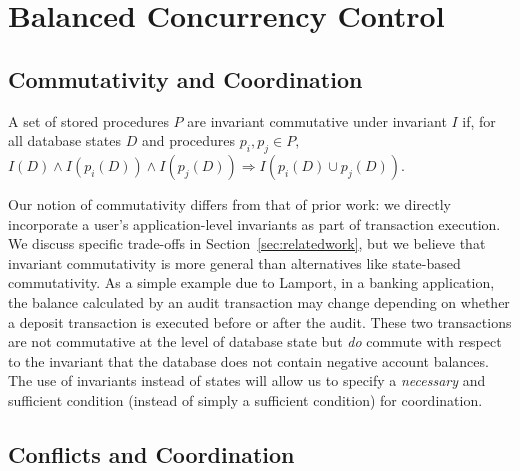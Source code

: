 
\section{Balanced Concurrency Control}
\label{sec:bcc-theory}

\subsection{Commutativity and Coordination}

\begin{definition}
A set of stored procedures $P$ are invariant commutative under
invariant $I$ if, for all database states $D$ and procedures $p_i, p_j
\in P,$$ I(D) \wedge I(p_i(D)) \wedge I(p_j(D)) \Rightarrow I(p_i(D)
\cup p_j(D))$.
\end{definition}

 Our notion of
commutativity differs from that of prior work: we directly incorporate
a user's application-level invariants as part of transaction
execution. We discuss specific trade-offs in
Section~\ref{sec:relatedwork}, but we believe that invariant
commutativity is more general than alternatives like state-based
commutativity. As a simple example due to Lamport, in a banking
application, the balance calculated by an audit transaction may change
depending on whether a deposit transaction is executed before or after
the audit. These two transactions are not commutative at the level of
database state but \textit{do} commute with respect to the invariant
that the database does not contain negative account balances. The use
of invariants instead of states will allow us to specify a
\textit{necessary} and sufficient condition (instead of simply a
sufficient condition) for coordination.

\subsection{Conflicts and Coordination}

\begin{theorem}

\end{theorem}
